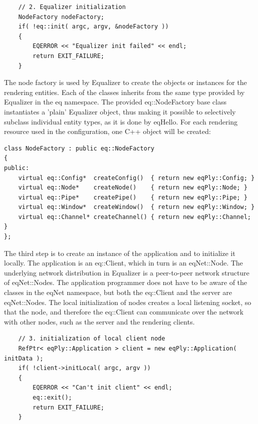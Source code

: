 \documentclass[10pt,a4]{scrartcl}
\begin{document}
{\footnotesize\begin{lstlisting}
    // 2. Equalizer initialization
    NodeFactory nodeFactory;
    if( !eq::init( argc, argv, &nodeFactory ))
    {
        EQERROR << "Equalizer init failed" << endl;
        return EXIT_FAILURE;
    }
\end{lstlisting}}%

The node factory is used by Equalizer to create the objects or instances for
the rendering entities. Each of the classes inherits from the same type
provided by Equalizer in the \textsf{eq} namespace. The provided
\textsf{eq::NodeFactory} base class instantiates a 'plain' Equalizer
object, thus making it possible to selectively subclass individual
entity types, as it is done by \textsf{eqHello}. For each rendering
resource used in the configuration, one C++ object will be created:

{\footnotesize\begin{lstlisting}
class NodeFactory : public eq::NodeFactory
{
public:
    virtual eq::Config*  createConfig()  { return new eqPly::Config; }
    virtual eq::Node*    createNode()    { return new eqPly::Node; }
    virtual eq::Pipe*    createPipe()    { return new eqPly::Pipe; }
    virtual eq::Window*  createWindow()  { return new eqPly::Window; }
    virtual eq::Channel* createChannel() { return new eqPly::Channel; }
};
\end{lstlisting}}

The third step is to create an instance of the application and to
initialize it locally. The application is an \textsf{eq::Client}, which
in turn is an \textsf{eqNet::Node}. The underlying network distribution
in Equalizer is a peer-to-peer network structure of
\textsf{eqNet::Node}s. The application programmer does not have to be
aware of the classes in the \textsf{eqNet} namespace, but both the
\textsf{eq::Client} and the server are \textsf{eqNet::Node}s. The local
initialization of nodes creates a local listening socket, so that the
node, and therefore the \textsf{eq::Client} can communicate over the
network with other nodes, such as the server and the rendering clients.

{\footnotesize\begin{lstlisting}
    // 3. initialization of local client node
    RefPtr< eqPly::Application > client = new eqPly::Application( initData );
    if( !client->initLocal( argc, argv ))
    {
        EQERROR << "Can't init client" << endl;
        eq::exit();
        return EXIT_FAILURE;
    }
\end{lstlisting}}%
\end{document}
